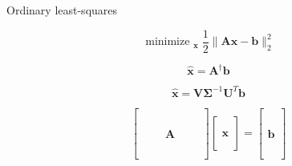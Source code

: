 \documentclass[aspectratio=169]{beamer}
\DeclareMathOperator*{\minimize}{minimize~}
\begin{document}
\begin{frame}{Ordinary least-squares}
  \vfill
  \begin{minipage}{.48\textwidth}
    \begin{overprint}
      \Large
      \[
      \minimize_{\bm{x}} \dfrac{1}{2} \| \bm{Ax} - \bm{b} \|_2^2
      \]

      \Large
      \[
      \hat{\bm{x}} = \bm{A}^{\dagger} \bm{b}
      \]

      \Large
      \[
      \hat{\bm{x}} = \bm{V} \boldsymbol{\Sigma}^{-1} \bm{U}^T \bm{b}
      \]
    \end{overprint}
  \end{minipage}%
  \hfill
  \begin{minipage}{.48\textwidth}
    \large
    \[
    \begin{bmatrix}
      ~ & ~ & ~ & ~ & ~ \\
      ~ & ~ & ~ & ~ & ~ \\
      ~ & ~ & ~ & ~ & ~ \\
      ~ & ~ & ~ & ~ & ~ \\
      ~ & ~ & \bm{A} & ~ & ~ \\
      ~ & ~ & ~ & ~ & ~ \\
      ~ & ~ & ~ & ~ & ~ \\
      ~ & ~ & ~ & ~ & ~ \\
      ~ & ~ & ~ & ~ & ~
    \end{bmatrix}
    \begin{bmatrix}
      ~ \\ ~ \\ \bm{x} \\ ~ \\ ~
    \end{bmatrix}
    =
    \begin{bmatrix}
      ~ \\ ~ \\ ~ \\ ~ \\ \bm{b} \\ ~ \\ ~ \\ ~ \\ ~
    \end{bmatrix}
    \]
  \end{minipage}
  \vfill
\end{frame}
\end{document}
